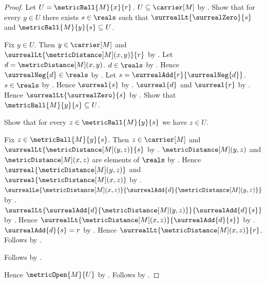 \begin{proof}
    Let $U=\metricBall{M}{x}{r}$.
    $U\subseteq\carrier[M]$ by .
    Show that for every $y\in U$ there exists $s\in\reals$ such that
        $\surrealLt{\surrealZero}{s}$ and
        $\metricBall{M}{y}{s}\subseteq U$.
    \begin{subproof}
        Fix $y\in U$.
        Then $y\in\carrier[M]$ and
            $\surrealLt{\metricDistance[M](x,y)}{r}$
            by .
        Let $d=\metricDistance[M](x,y)$.
        $d\in\reals$ by .
        Hence $\surrealNeg{d}\in\reals$
            by .
        Let $s=\surrealAdd{r}{\surrealNeg{d}}$.
        $s\in\reals$ by .
        Hence $\surreal{s}$ by .
        $\surreal{d}$ and $\surreal{r}$
            by .
        Hence $\surrealLt{\surrealZero}{s}$
            by .
        Show that $\metricBall{M}{y}{s}\subseteq U$.
        \begin{subproof}
            Show that for every $z\in\metricBall{M}{y}{s}$ we have
                $z\in U$.
            \begin{subproof}
                Fix $z\in\metricBall{M}{y}{s}$.
                Then $z\in\carrier[M]$ and
                    $\surrealLt{\metricDistance[M](y,z)}{s}$
                    by .
                $\metricDistance[M](y,z)$ and
                    $\metricDistance[M](x,z)$ are elements of $\reals$
                    by .
                Hence $\surreal{\metricDistance[M](y,z)}$ and
                    $\surreal{\metricDistance[M](x,z)}$
                    by .
                $\surrealLe{\metricDistance[M](x,z)}
                    {\surrealAdd{d}{\metricDistance[M](y,z)}}$
                    by .
                $\surrealLt{
                    \surrealAdd{d}{\metricDistance[M](y,z)}}
                    {\surrealAdd{d}{s}}$
                    by .
                Hence $\surrealLt{\metricDistance[M](x,z)}
                    {\surrealAdd{d}{s}}$
                    by .
                $\surrealAdd{d}{s}=r$
                    by
                    .
                Hence $\surrealLt{\metricDistance[M](x,z)}{r}$.
                Follows by .
            \end{subproof}
            Follows by .
        \end{subproof}
    \end{subproof}
    Hence $\metricOpen{M}{U}$ by .
    Follows by .
\end{proof}

